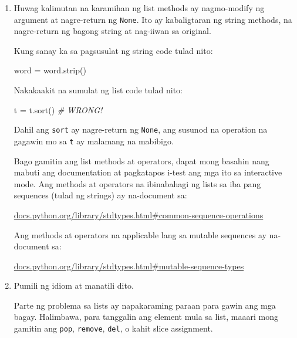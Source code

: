 \documentclass[10pt,]{book}
\newenvironment{Shaded}{}{}
\newcommand{\CommentTok}[1]{\textcolor[rgb]{0.38,0.63,0.69}{\textit{#1}}}
\newcommand{\NormalTok}[1]{#1}
\newcommand{\OperatorTok}[1]{\textcolor[rgb]{0.40,0.40,0.40}{#1}}
\begin{document}
\begin{enumerate}
\def\labelenumi{\arabic{enumi}.}
\item
  Huwag kalimutan na karamihan ng list methods ay nagmo-modify ng
  argument at nagre-return ng \texttt{None}. Ito ay kabaligtaran ng
  string methods, na nagre-return ng bagong string at nag-iiwan sa
  original.

  Kung sanay ka sa pagsusulat ng string code tulad nito:

\begin{Shaded}
\begin{Highlighting}[]
\NormalTok{word }\OperatorTok{=}\NormalTok{ word.strip()}
\end{Highlighting}
\end{Shaded}

  Nakakaakit na sumulat ng list code tulad nito:

\begin{Shaded}
\begin{Highlighting}[]
\NormalTok{t }\OperatorTok{=}\NormalTok{ t.sort()           }\CommentTok{\# WRONG!}
\end{Highlighting}
\end{Shaded}

   

  Dahil ang \texttt{sort} ay nagre-return ng \texttt{None}, ang susunod
  na operation na gagawin mo sa \texttt{t} ay malamang na mabibigo.

  Bago gamitin ang list methods at operators, dapat mong basahin nang
  mabuti ang documentation at pagkatapos i-test ang mga ito sa
  interactive mode. Ang methods at operators na ibinabahagi ng lists sa
  iba pang sequences (tulad ng strings) ay na-document sa:

  \href{https://docs.python.org/library/stdtypes.html\#common-sequence-operations}{docs.python.org/library/stdtypes.html\#common-sequence-operations}

  Ang methods at operators na applicable lang sa mutable sequences ay
  na-document sa:

  \href{https://docs.python.org/library/stdtypes.html\#mutable-sequence-types}{docs.python.org/library/stdtypes.html\#mutable-sequence-types}
\item
  Pumili ng idiom at manatili dito.


  Parte ng problema sa lists ay napakaraming paraan para gawin ang mga
  bagay. Halimbawa, para tanggalin ang element mula sa list, maaari mong
  gamitin ang \texttt{pop}, \texttt{remove}, \texttt{del}, o kahit slice
  assignment.


\end{enumerate}
\end{document}
